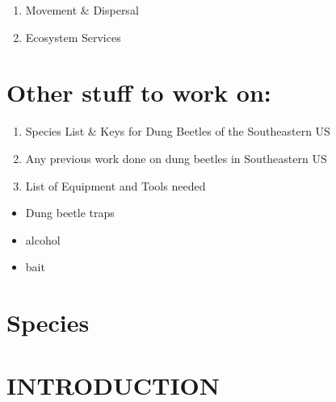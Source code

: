 \documentclass[
  12pt,
]{article}
\providecommand{\tightlist}{%
  \setlength{\itemsep}{0pt}\setlength{\parskip}{0pt}}
\begin{document}
\begin{enumerate}
\def\labelenumi{\arabic{enumi}.}
\setcounter{enumi}{1}
\item
  Movement \& Dispersal
\item
  Ecosystem Services
\end{enumerate}

\hypertarget{other-stuff-to-work-on}{%
\section{Other stuff to work on:}\label{other-stuff-to-work-on}}

\begin{enumerate}
\def\labelenumi{\arabic{enumi}.}
\tightlist
\item
  Species List \& Keys for Dung Beetles of the Southeastern US
\item
  Any previous work done on dung beetles in Southeastern US
\item
  List of Equipment and Tools needed
\end{enumerate}

\begin{itemize}
\tightlist
\item
  Dung beetle traps
\item
  alcohol
\item
  bait
\end{itemize}

\hypertarget{species}{%
\section{Species}\label{species}}

\newpage

\hypertarget{introduction}{%
\section{INTRODUCTION}\label{introduction}}
\end{document}
